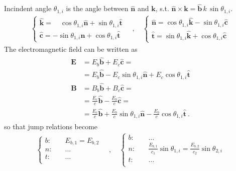 \documentclass[letterpaper,10pt,italian]{jupyterBook}
\begin{document}
\sphinxAtStartPar
Incindent angle \(\theta_{1,i}\) is the angle between \(\hat{\mathbf{n}}\) and \(\mathbf{k}\), s.t. \(\hat{\mathbf{n}} \times \mathbf{k} = \hat{\mathbf{b}} \, k \, \sin \theta_{1,i}\).
\begin{equation*}
\begin{split}\begin{cases}
  \hat{\mathbf{k}} = \quad \cos \theta_{1,i} \hat{\mathbf{n}} + \sin \theta_{1,i} \hat{\mathbf{t}} \\
  \hat{\mathbf{c}} =      -\sin \theta_{1,i} \hat{\mathbf{n}} + \cos \theta_{1,i} \hat{\mathbf{t}}
\end{cases}
\quad , \quad
\begin{cases}
  \hat{\mathbf{n}} = \cos \theta_{1,i} \hat{\mathbf{k}} - \sin \theta_{1,i} \hat{\mathbf{c}} \\
  \hat{\mathbf{t}} = \sin \theta_{1,i} \hat{\mathbf{k}} + \cos \theta_{1,i} \hat{\mathbf{c}}
\end{cases}\end{split}
\end{equation*}
\sphinxAtStartPar
The electromagnetic field can be written as
\begin{equation*}
\begin{split}\begin{aligned}
  \mathbf{E} & = E_b \hat{\mathbf{b}} + E_c \hat{\mathbf{c}} = \\
             & = E_b \hat{\mathbf{b}} - E_c \sin \theta_{1,i} \hat{\mathbf{n}} + E_c \cos \theta_{1,i} \hat{\mathbf{t}} \\
  \mathbf{B} & = B_b \hat{\mathbf{b}} + B_c \hat{\mathbf{c}} = \\
             & = \frac{E_c}{c} \hat{\mathbf{b}} - \frac{E_b}{c} \hat{\mathbf{c}} = \\
             & = \frac{E_c}{c} \hat{\mathbf{b}} + \frac{E_b}{c} \sin \theta_{1,i} \hat{\mathbf{n}} - \frac{E_b}{c} \cos \theta_{1,i} \hat{\mathbf{t}} \ .
\end{aligned}\end{split}
\end{equation*}
\sphinxAtStartPar
so that jump relations become
\begin{equation*}
\begin{split}\begin{cases}
  b: & \quad E_{b,1} = E_{b,2} \\
  n: & \quad \dots \\
  t: & \quad \dots \\
\end{cases}
\quad , \quad
\begin{cases}
  b: & \quad \dots \\
  n: & \quad \frac{E_{b,1}}{c_1} \sin \theta_{1,i} = \frac{E_{b,2}}{c_2} \sin \theta_{2,i}  \\
  t: & \quad \dots \\
\end{cases}\end{split}
\end{equation*}
\end{document}
